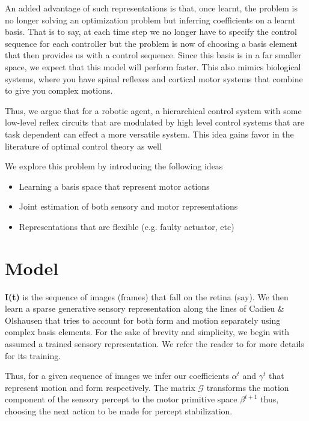 \documentclass[conference]{IEEEtran}
\begin{document}
An added advantage of such representations is that, once learnt, the problem is no longer solving an optimization problem but inferring coefficients on a learnt basis. That is to say, at each time step we no longer have to specify the control sequence for each controller but the problem is now of choosing a basis element that then provides us with a control sequence. Since this basis is in a far smaller space, we expect that this model will perform faster. This also mimics biological systems, where you have spinal reflexes and cortical motor systems that combine to give you complex motions\cite{kandel2000principles}. 

Thus, we argue that for a robotic agent, a hierarchical control system with some low-level reflex circuits that are modulated by high level control systems that are task dependent can effect a more versatile system. This idea gains favor in the literature of optimal control theory as well \cite{todorov2004optimality}

We explore this problem by introducing the following ideas 
\begin{itemize}
\item Learning a basis space that represent motor actions 
\item Joint estimation of both sensory and motor representations
\item Representations that are flexible (e.g. faulty actuator, etc)
\end{itemize}


\section{Model}
\textbf{I(t)} is the sequence of images (frames) that fall on the retina (say). We then learn a sparse generative sensory representation along the lines of Cadieu \& Olshausen  \cite{cadieu2012learning} that tries to account for both form and motion separately using complex basis elements. For the sake of brevity and simplicity, we begin with assumed a trained sensory representation. We refer the reader to \cite{cadieu2012learning} for more details for its training.

Thus, for a given sequence of images we infer our coefficients $\alpha^{t}$ and $\gamma^{t}$ that represent motion and form respectively. The matrix $\mathcal{G}$ transforms the motion component of the sensory percept to the motor primitive space $\beta^{t+1}$ thus, choosing the next action to be made for percept stabilization. 
\end{document}

